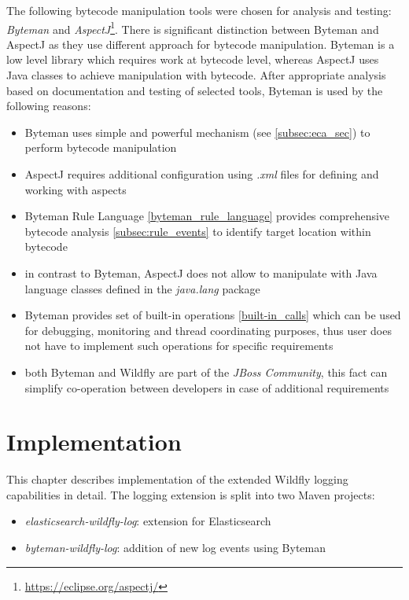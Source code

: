 \documentclass[12pt,oneside]{fithesis2}
\begin{document}
The following bytecode manipulation tools were chosen for analysis and testing: \textit{Byteman} and \textit{AspectJ}\footnote{\url{https://eclipse.org/aspectj/}}. There is significant distinction between Byteman and AspectJ as they use different approach for bytecode manipulation. Byteman is a low level library which requires work at bytecode level, whereas AspectJ uses Java classes to achieve manipulation with bytecode. After appropriate analysis based on documentation and testing of selected tools, Byteman is used by the following reasons:

\begin{itemize}
	\item Byteman uses simple and powerful mechanism (see \ref{subsec:eca_sec}) to perform bytecode manipulation 
	\item AspectJ requires additional configuration using \textit{.xml} files for defining and working with aspects \cite[Configuration]{aspectj_doc}
	\item Byteman Rule Language \ref{byteman_rule_language} provides comprehensive bytecode analysis \ref{subsec:rule_events} to identify target location within bytecode
	\item in contrast to Byteman, AspectJ does not allow to manipulate with Java language classes defined in the \textit{java.lang} package \cite[Special cases]{aspectj_doc}
	\item Byteman provides set of built-in operations \ref{built-in_calls} which can be used for debugging, monitoring and thread coordinating purposes, thus user does not have to implement such operations for specific requirements
	\item both Byteman and Wildfly are part of the \textit{JBoss Community}, this fact can simplify co-operation between developers in case of additional requirements
\end{itemize}

\chapter{Implementation}
\label{implementation}
This chapter describes implementation of the extended Wildfly logging capabilities in detail. The logging extension is split into two Maven projects:

\begin{itemize}
	\item \textit{elasticsearch-wildfly-log}: extension for Elasticsearch
	\item \textit{byteman-wildfly-log}: addition of new log events using Byteman
\end{itemize}
\end{document}
